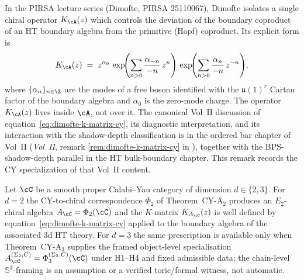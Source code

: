 \begin{remark}
\label{rem:dimofte-k-matrix-cy}
In the PIRSA lecture series (Dimofte, PIRSA 25110067), Dimofte isolates a single chiral operator $K_\cA(z)$ which controls the deviation of the boundary coproduct of an HT boundary algebra from the primitive (Hopf) coproduct. Its explicit form is
\begin{equation}
\label{eq:dimofte-k-matrix-cy}
K_\cA(z) \;=\; z^{\alpha_0}\,\exp\!\Biggl(\sum_{n>0} \frac{\alpha_{-n}}{-n}\, z^{n}\Biggr)\,\exp\!\Biggl(\sum_{n>0} \frac{\alpha_{n}}{-n}\, z^{-n}\Biggr),
\end{equation}
where $\{\alpha_n\}_{n \in \Z}$ are the modes of a free boson identified with the $\mathfrak{u}(1)^r$ Cartan factor of the boundary algebra and $\alpha_0$ is the zero-mode charge. The operator $K_\cA(z)$ lives inside $\cA$, not over it. The canonical Vol~II discussion of equation~\eqref{eq:dimofte-k-matrix-cy}, its diagnostic interpretation, and its interaction with the shadow-depth classification is in the ordered bar chapter of Vol~II (\emph{Vol~II}, remark \ref{rem:dimofte-k-matrix-cy} in \cite{VolII}), together with the BPS-shadow-depth parallel in the HT bulk-boundary chapter. This remark records the CY specialization of that Vol~II content.

Let $\cC$ be a smooth proper Calabi--Yau category of dimension $d \in \{2, 3\}$. For $d = 2$ the CY-to-chiral correspondence $\Phi_2$ of Theorem~CY-A$_2$ produces an $E_2$-chiral algebra $A_\cC = \Phi_2(\cC)$ and the $K$-matrix $K_{A_\cC}(z)$ is well defined by equation~\eqref{eq:dimofte-k-matrix-cy} applied to the boundary algebra of the associated 3d HT theory. For $d = 3$ the same prescription is available only when Theorem~CY-A$_3$ supplies the framed object-level specialisation $A_\cC^{(\Sigma_2,C)}=\Phi_3^{(\Sigma_2,C)}(\cC)$ under H1--H4 and fixed admissible data; the chain-level $\mathbb{S}^3$-framing is an assumption or a verified toric/formal witness, not automatic.


\end{remark}

